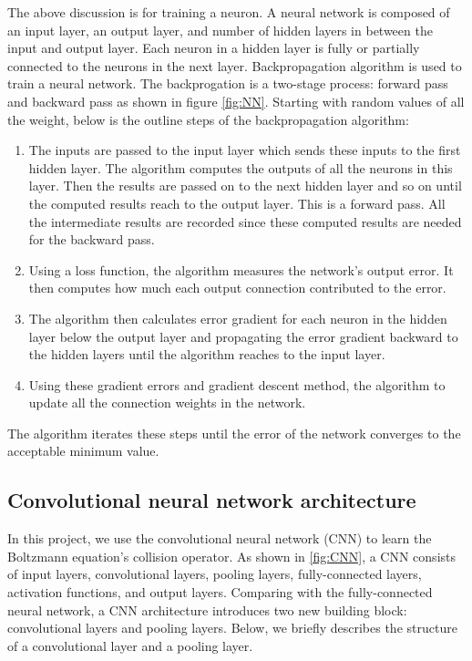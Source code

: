 \documentclass{article}
\begin{document}
The above discussion is for training a neuron. A neural network is composed of an input layer, an output layer, and number of hidden layers in between the input and output layer. Each neuron in a hidden layer is fully or partially connected to the neurons in the next layer. Backpropagation algorithm is used to train a neural network. The backprogation is a two-stage process: forward pass and backward pass as shown in figure \ref{fig:NN}. Starting with random values of all the weight, below is the outline steps of the backpropagation algorithm:
\begin{enumerate}
\item The inputs are passed to the input layer which sends these inputs to the first hidden layer. The algorithm computes the outputs of all the neurons in this layer. Then the results are passed on to the next hidden layer and so on until the computed results reach to the output layer. This is a forward pass. All the intermediate results are recorded since these computed results are needed for the backward pass.
\item Using a loss function, the algorithm measures the network's output error. It then computes how much each output connection contributed to the error.
\item The algorithm then calculates error gradient for each neuron in the hidden layer below the output layer and propagating the error gradient backward to the hidden layers until the algorithm reaches to the input layer.
\item Using these gradient errors and gradient descent method, the algorithm to update all the connection weights in the network. 
\end{enumerate}
The algorithm iterates these steps until the error of the network converges to the acceptable minimum value.

\subsection{Convolutional neural network architecture} \label{CNN}
In this project, we use the convolutional neural network (CNN) to learn the Boltzmann equation's collision operator. As shown in \ref{fig:CNN}, a CNN consists of input layers, convolutional layers, pooling layers, fully-connected layers, activation functions, and output layers. Comparing with the fully-connected neural network, a CNN architecture introduces two new building block: convolutional layers and pooling layers. Below, we briefly describes the structure of a convolutional layer and a pooling layer.
\end{document}
